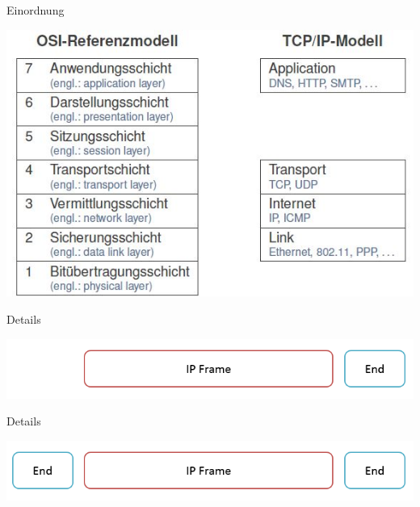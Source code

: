 \documentclass[beamer]{uibk}
\begin{document}
\begin{frame}{Einordnung}

  \begin{center}
  \includegraphics[scale=0.5]{layer.jpg}
  \end{center}

\end{frame}

\begin{frame}{Details}
  \newpage
  \begin{center}
  \includegraphics[scale=0.5]{ip1.png}
  \end{center}

\end{frame}

\begin{frame}{Details}
  \newpage
  \begin{center}
  \includegraphics[scale=0.5]{ip2.png}
  \end{center}
\end{frame}
\end{document}
